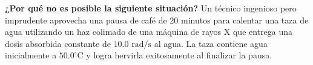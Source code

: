 \item \textbf{¿Por qué no es posible la siguiente situación?}
Un técnico ingenioso pero imprudente aprovecha una pausa de café de 20 minutos para calentar una taza de agua utilizando un haz colimado de una máquina de rayos X que entrega una dosis absorbida constante de $10.0\text{ rad/s}$ al agua. La taza contiene agua inicialmente a $50.0^\circ\text{C}$ y logra hervirla exitosamente al finalizar la pausa.